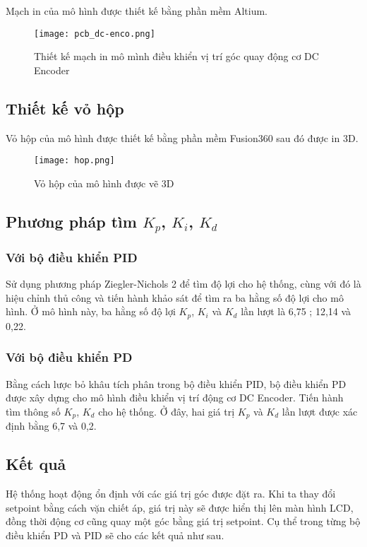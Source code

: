 Mạch in của mô hình được thiết kế bằng phần mềm Altium.

\begin{figure}[h!]
	\centering
	\texttt{[image: pcb\_dc-enco.png]}
	\caption[Thiết kế mạch in mô mình điều khiển vị trí góc quay động cơ DC Encoder]{Thiết kế mạch in mô mình điều khiển vị trí góc quay động cơ DC Encoder}
	\label{fig:Thiết kế mạch in mô mình điều khiển vị trí góc quay động cơ DC Encoder}
\end{figure}
\newpage
\subsection{Thiết kế vỏ hộp}
 Vỏ hộp của mô hình được thiết kế bằng phần mềm Fusion360 sau đó được in 3D.
 
 \begin{figure}[h!]
 	\centering
 	\texttt{[image: hop.png]}
 	\caption[Vỏ hộp của mô hình được vẽ 3D]{Vỏ hộp của mô hình được vẽ 3D}
 	\label{fig:Vỏ hộp của mô hình được vẽ 3D}
 \end{figure}


\subsection{Phương pháp tìm $K_p$, $K_i$, $K_d$}
\subsubsection{Với bộ điều khiển PID}
Sử dụng phương pháp Ziegler-Nichols 2 để tìm độ lợi cho hệ thống, cùng với đó là hiệu chỉnh thủ công và tiến hành khảo sát để tìm ra ba hằng số độ lợi cho mô hình. Ở mô hình này, ba hằng số độ lợi $K_p$, $K_i$  và $K_d$ lần lượt là 6,75 ; 12,14 và 0,22.

\subsubsection{Với bộ điều khiển PD}
Bằng cách lược bỏ khâu tích phân trong bộ điều khiển PID, bộ điều khiển PD được xây dựng cho mô hình điều khiển vị trí động cơ DC Encoder. Tiến hành tìm thông số $K_p$, $K_d$ cho hệ thống. Ở đây, hai giá trị $K_p$ và $K_d$ lần lượt được xác định bằng 6,7 và 0,2.
\newpage
\subsection{Kết quả}
Hệ thống hoạt động ổn định với các giá trị góc được đặt ra. Khi ta thay đổi setpoint bằng cách vặn chiết áp, giá trị này sẽ được hiển thị lên màn hình LCD, đồng thời động cơ cũng quay một góc bằng giá trị setpoint. Cụ thể trong từng bộ điều khiển PD và PID sẽ cho các kết quả như sau.

